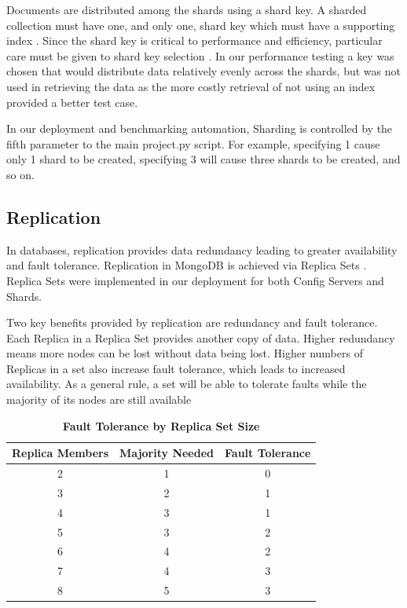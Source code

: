 \documentclass[9pt,twocolumn,twoside]{../../styles/osajnl}
\begin{document}
Documents are distributed among the shards using a shard key.  A sharded collection must have one, and only one, shard key which must have a supporting index \cite{www-sharding}.  Since the shard key is critical to performance and efficiency, particular care must be given to shard key selection \cite{www-shardkey}. In our performance testing a key was chosen that would distribute data relatively evenly across the shards, but was not used in retrieving the data as the more costly retrieval of not using an index provided a better test case.


In our deployment and benchmarking automation, Sharding is controlled by the fifth parameter to the main project.py script.  For example, specifying 1 cause only 1 shard to be created, specifying 3 will cause three shards to be created, and so on.

\subsection{Replication}

In databases, replication provides data redundancy leading to greater availability and fault tolerance.  Replication in MongoDB is achieved via Replica Sets \cite{www-replication}.  Replica Sets were implemented in our deployment for both Config Servers and Shards.

Two key benefits provided by replication are redundancy and fault tolerance.
Each Replica in a Replica Set provides another copy of data.  Higher redundancy means more nodes can be lost without data being lost. Higher numbers of Replicas in a set also increase fault tolerance, which leads to increased availability.  As a general rule, a set will be able to tolerate faults while the majority of its nodes are still available


\begin{table}[htbp]
\centering
\caption{\bf Fault Tolerance by Replica Set Size \cite{www-mongoRepDep}}

 \begin{tabular}{|c | c | c|} 
 \hline
Replica Members &  Majority Needed & Fault Tolerance \\ [0.5ex] 
 \hline\hline
    
2 &	1 &	0 \\
 \hline
3 &	2 &	1 \\ 
 \hline
4 &	3 &	1 \\ 
 \hline
5 &	3 &	2 \\ 
 \hline
6 &	4 &	2\\ 
 \hline
7 &	4 &	3\\ 
 \hline
8 &	5 &	3\\ [1ex] 
 \hline

\end{tabular}
  \label{tab:fault-tolerance}
\end{table}
\end{document}
